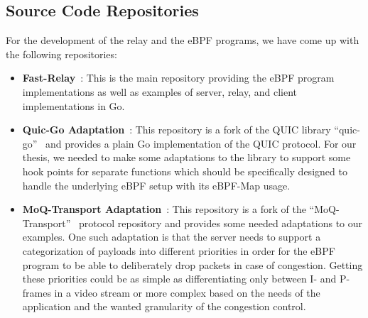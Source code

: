 \subsection{Source Code Repositories}\label{sec:source_code_repos}
For the development of the relay and the eBPF programs, we have come up with the following repositories:
\begin{itemize}

    \item \textbf{Fast-Relay}~\parencite{adaptive-moq-repo}:
    This is the main repository providing the eBPF program implementations as well as examples of 
    server, relay, and client implementations in Go.
    
    \item \textbf{Quic-Go Adaptation}~\parencite{quic-go-prio-packs-repo}:
    This repository is a fork of the QUIC library ``quic-go''~\parencite{quic-go-repo} and provides a 
    plain Go implementation of the QUIC protocol.
    For our thesis, we needed to make some adaptations to the library to support some hook points for 
    separate functions which should be specifically designed to handle the underlying eBPF setup with its eBPF-Map usage. 
    
    \item \textbf{MoQ-Transport Adaptation}~\parencite{priority-moqtransport-repo}:
    This repository is a fork of the ``MoQ-Transport''~\parencite{draft-moqtransport} protocol repository and provides
    some needed adaptations to our examples. One such adaptation is that the server needs to support a 
    categorization of payloads into different priorities in order for the eBPF program to be able to 
    deliberately drop packets in case of congestion.
    Getting these priorities could be as simple as differentiating only between I- and P-frames in a video 
    stream or more complex based on the needs of the application and the wanted granularity of the congestion 
    control.
    
\end{itemize}